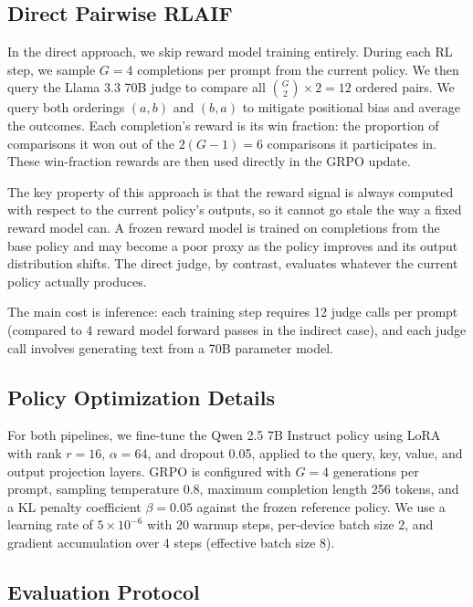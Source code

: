 \documentclass{article}
\begin{document}
\subsection{Direct Pairwise RLAIF}

In the direct approach, we skip reward model training entirely. During each RL step, we sample $G = 4$ completions per prompt from the current policy. We then query the Llama 3.3 70B judge to compare all $\binom{G}{2} \times 2 = 12$ ordered pairs. We query both orderings $(a, b)$ and $(b, a)$ to mitigate positional bias and average the outcomes. Each completion's reward is its win fraction: the proportion of comparisons it won out of the $2(G - 1) = 6$ comparisons it participates in. These win-fraction rewards are then used directly in the GRPO update.

The key property of this approach is that the reward signal is always computed with respect to the current policy's outputs, so it cannot go stale the way a fixed reward model can. A frozen reward model is trained on completions from the base policy and may become a poor proxy as the policy improves and its output distribution shifts. The direct judge, by contrast, evaluates whatever the current policy actually produces.

The main cost is inference: each training step requires 12 judge calls per prompt (compared to 4 reward model forward passes in the indirect case), and each judge call involves generating text from a 70B parameter model.

\subsection{Policy Optimization Details}

For both pipelines, we fine-tune the Qwen 2.5 7B Instruct policy using LoRA \citep{hu2022lora} with rank $r = 16$, $\alpha = 64$, and dropout 0.05, applied to the query, key, value, and output projection layers. GRPO is configured with $G = 4$ generations per prompt, sampling temperature 0.8, maximum completion length 256 tokens, and a KL penalty coefficient $\beta = 0.05$ against the frozen reference policy. We use a learning rate of $5 \times 10^{-6}$ with 20 warmup steps, per-device batch size 2, and gradient accumulation over 4 steps (effective batch size 8).

\subsection{Evaluation Protocol}
\end{document}
